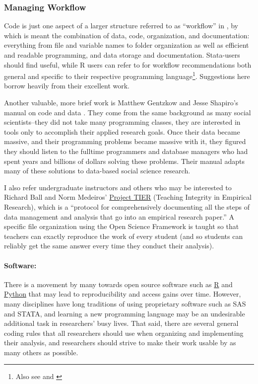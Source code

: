 \documentclass[12pt] {article}
\begin{document}
\subsubsection{Managing Workflow}\label{managing-workflow}

Code is just one aspect of a larger structure referred to as
``workflow'' in \cite{long_workflow_2008}, by which is meant the
combination of data, code, organization, and documentation: everything
from file and variable names to folder organization as well as efficient
and readable programming, and data storage and documentation. Stata-users should find \cite{long_workflow_2008} useful, while R users can refer to \cite{gandrud2013reproducible} for workflow recommendations both general and specific to their respective programming language\footnote{Also see and \cite{kirchkamp_workflow_????}}. Suggestions here borrow heavily from their excellent work. 

Another valuable, more brief work is Matthew Gentzkow and Jesse Shapiro's manual on code and data \href{http://faculty.chicagobooth.edu/jesse.shapiro/research/CodeAndData.pdf}{\citep{GentzkowShapiro}}. They come from the same background as many social scientists--they did not take many programming classes, they are interested in tools only to accomplish their applied research goals. Once their data became massive, and their programming problems became massive with it, they figured they should listen to the fulltime programmers and database managers who had spent years and billions of dollars solving these problems. Their manual adapts many of these solutions to data-based social science research.   

I also refer undergraduate instructors and others who may be interested to Richard Ball and Norm Medeiros' \href{http://www.haverford.edu/TIER/}{Project TIER} (Teaching Integrity in Empirical Research), which is a ``protocol for comprehensively documenting all the steps of data management and analysis that go into an empirical research paper.'' A specific file organization using the Open Science Framework is taught so that teachers can exactly reproduce the work of every student (and so students can reliably get the same answer every time they conduct their analysis). 

\paragraph{Software:}
There is a movement by many towards open source software such
as \href{http://www.r-project.org/}{R} and \href{https://www.python.org/}{Python} that may lead to reproducibility and access gains over time. However, many disciplines have long
traditions of using proprietary software such as SAS and STATA, and
learning a new programming language may be an undesirable additional
task in researchers' busy lives. That said, there are several general
coding rules that all researchers should use when organizing and
implementing their analysis, and researchers should strive to make their
work usable by as many others as possible.
\end{document}

